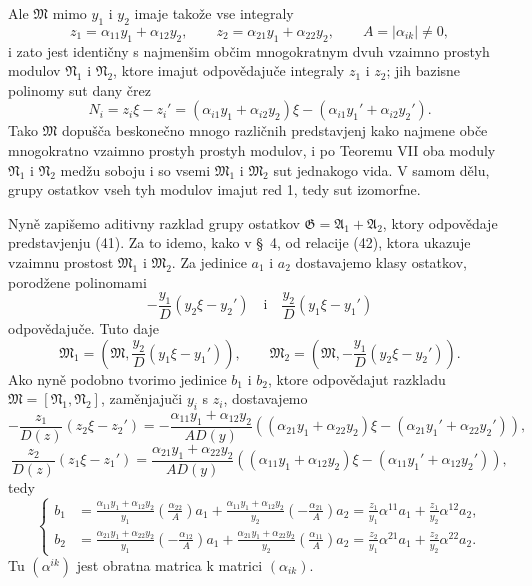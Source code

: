 \documentclass[11pt]{article}
\begin{document}
Ale \(\mathfrak M\) mimo \(y_1\) i \(y_2\) imaje takože vse integraly
\[
 z_1=\alpha_{11}y_1+\alpha_{12}y_2,
 \qquad
 z_2=\alpha_{21}y_1+\alpha_{22}y_2,
 \qquad
 A=|\alpha_{ik}|\ne0,
\]
i zato jest identičny s najmenšim občim mnogokratnym dvuh vzaimno prostyh modulov \(\mathfrak N_1\) i \(\mathfrak N_2\), ktore imajut odpovědajuče integraly \(z_1\) i \(z_2\); jih bazisne polinomy sut dany črez
\[
 N_i=z_i\xi-z_i'=(\alpha_{i1}y_1+\alpha_{i2}y_2)\xi-(\alpha_{i1}y_1'+\alpha_{i2}y_2').
\]
Tako \(\mathfrak M\) dopušča beskonečno mnogo različnih predstavjenj kako najmene obče mnogokratno vzaimno prostyh prostyh modulov, i po Teoremu VII oba moduly \(\mathfrak N_1\) i \(\mathfrak N_2\) medžu soboju i so vsemi \(\mathfrak M_1\) i \(\mathfrak M_2\) sut jednakogo vida. V samom dělu, grupy ostatkov vseh tyh modulov imajut red 1, tedy sut izomorfne.

Nyně zapišemo aditivny razklad grupy ostatkov \(\mathfrak G=\mathfrak A_1+\mathfrak A_2\), ktory odpovědaje predstavjenju (41). Za to idemo, kako v \S~4, od relacije (42), ktora ukazuje vzaimnu prostost \(\mathfrak M_1\) i \(\mathfrak M_2\). Za jedinice \(a_1\) i \(a_2\) dostavajemo klasy ostatkov, porodžene polinomami
\[
 -\frac{y_1}{D}(y_2\xi-y_2')
 \quad\text{i}\quad
 \frac{y_2}{D}(y_1\xi-y_1')
\]
odpovědajuče. Tuto daje
\[
 \mathfrak M_1=\left(\mathfrak M,\frac{y_2}{D}(y_1\xi-y_1')\right),
 \qquad
 \mathfrak M_2=\left(\mathfrak M,-\frac{y_1}{D}(y_2\xi-y_2')\right).
\]
Ako nyně podobno tvorimo jedinice \(b_1\) i \(b_2\), ktore odpovědajut razkladu \(\mathfrak M=[\mathfrak N_1,
\mathfrak N_2]\), zaměnjajuči \(y_i\) s \(z_i\), dostavajemo
\[
 -\frac{z_1}{D(z)}(z_2\xi-z_2')
 =-\frac{\alpha_{11}y_1+\alpha_{12}y_2}{AD(y)}
 ((\alpha_{21}y_1+\alpha_{22}y_2)\xi-(\alpha_{21}y_1'+\alpha_{22}y_2')),
\]
\[
 \frac{z_2}{D(z)}(z_1\xi-z_1')
 =\frac{\alpha_{21}y_1+\alpha_{22}y_2}{AD(y)}
 ((\alpha_{11}y_1+\alpha_{12}y_2)\xi-(\alpha_{11}y_1'+\alpha_{12}y_2')),
\]
tedy
\begin{equation}
\left\{
\begin{aligned}
 b_1&=\frac{\alpha_{11}y_1+\alpha_{12}y_2}{y_1}
 \left(\frac{\alpha_{22}}{A}\right)a_1
 +\frac{\alpha_{11}y_1+\alpha_{12}y_2}{y_2}
 \left(-\frac{\alpha_{21}}{A}\right)a_2
 =\frac{z_1}{y_1}\alpha^{11}a_1+\frac{z_1}{y_2}\alpha^{12}a_2,\\
 b_2&=\frac{\alpha_{21}y_1+\alpha_{22}y_2}{y_1}
 \left(-\frac{\alpha_{12}}{A}\right)a_1
 +\frac{\alpha_{21}y_1+\alpha_{22}y_2}{y_2}
 \left(\frac{\alpha_{11}}{A}\right)a_2
 =\frac{z_2}{y_1}\alpha^{21}a_1+\frac{z_2}{y_2}\alpha^{22}a_2.
\end{aligned}\right.
\tag{43}
\end{equation}
Tu \((\alpha^{ik})\) jest obratna matrica k matrici \((\alpha_{ik})\).
\end{document}
